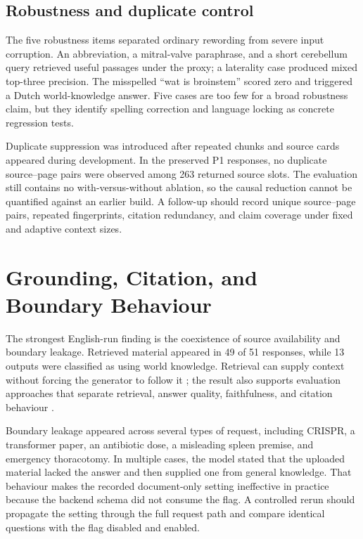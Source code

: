 \subsection{Robustness and duplicate control}
\label{subsec:query-dedup-results}

The five robustness items separated ordinary rewording from severe input corruption. An abbreviation, a mitral-valve paraphrase, and a short cerebellum query retrieved useful passages under the proxy; a laterality case produced mixed top-three precision. The misspelled ``wat is broinstem'' scored zero and triggered a Dutch world-knowledge answer. Five cases are too few for a broad robustness claim, but they identify spelling correction and language locking as concrete regression tests.

Duplicate suppression was introduced after repeated chunks and source cards appeared during development. In the preserved P1 responses, no duplicate source--page pairs were observed among 263 returned source slots. The evaluation still contains no with-versus-without ablation, so the causal reduction cannot be quantified against an earlier build. A follow-up should record unique source--page pairs, repeated fingerprints, citation redundancy, and claim coverage under fixed and adaptive context sizes.

\section{Grounding, Citation, and Boundary Behaviour}
\label{sec:grounding-boundary-results}

The strongest English-run finding is the coexistence of source availability and boundary leakage. Retrieved material appeared in 49 of 51 responses, while 13 outputs were classified as using world knowledge. Retrieval can supply context without forcing the generator to follow it \parencite{lewis2020,ji2023}; the result also supports evaluation approaches that separate retrieval, answer quality, faithfulness, and citation behaviour \parencite{es2024ragas}.

Boundary leakage appeared across several types of request, including CRISPR, a transformer paper, an antibiotic dose, a misleading spleen premise, and emergency thoracotomy. In multiple cases, the model stated that the uploaded material lacked the answer and then supplied one from general knowledge. That behaviour makes the recorded document-only setting ineffective in practice because the backend schema did not consume the flag. A controlled rerun should propagate the setting through the full request path and compare identical questions with the flag disabled and enabled.

